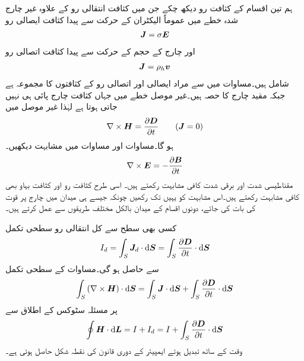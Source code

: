 ہم تین اقسام کے کثافت رو دیکھ چکے جن میں کثافت انتقالی رو کے علاوہ  غیر چارج شدہ خطے میں عموماً الیکٹران کے حرکت سے پیدا  کثافت ایصالی رو
\begin{align}
{\ensuremath{{\boldsymbol{J}}}}=\sigma {\ensuremath{{\boldsymbol{E}}}}
\end{align}
اور چارج کے حجم کے حرکت سے پیدا کثافت اتصالی رو
\begin{align}
{\ensuremath{{\boldsymbol{J}}}}=\rho_h {{\boldsymbol{v}}}
\end{align}
شامل ہیں۔مساوات  میں  سے مراد ایصالی اور اتصالی رو کے کثافتوں کا مجموعہ ہے جبکہ مقید چارج  کا حصہ ہیں۔غیر موصل خطے میں جہاں کثافت چارج پائی ہی نہیں جاتی  ہوتا ہے لہٰذا غیر موصل میں
\begin{align}\label{مساوات_میکس_ویل_مقناطیسی_شدت_گردش}
\nabla \times {\ensuremath{{\boldsymbol{H}}}}=\frac{\partial {\ensuremath{{\boldsymbol{D}}}}}{\partial t}  \quad \quad ({{\boldsymbol{J}}}=0)
\end{align}
ہو گا۔مساوات  اور مساوات  میں مشابہت دیکھیں۔
\begin{align*}
\nabla \times {\ensuremath{{\boldsymbol{E}}}}=-\frac{\partial {\ensuremath{{\boldsymbol{B}}}}}{\partial t}
\end{align*} 
مقناطیسی شدت  اور برقی شدت  کافی مشابہت رکھتے ہیں۔ اسی طرح کثافت رو  اور کثافت بہاو  بھی کافی مشابہت رکھتے ہیں۔اس مشابہت کو یہیں تک رکھیں چونکہ جیسے ہی میدان میں چارج پر قوت کی بات کی جائے، دونوں اقسام کے میدان بالکل مختلف طریقوں سے  عمل کرتے ہیں۔

کسی بھی سطح سے کل انتقالی رو سطحی تکمل
\begin{align}
I_d=\int_S \kvec{J}_d \cdot \dif \kvec{S}=\int_S \frac{\partial \kvec{D}}{\partial t} \cdot \dif \kvec{S}
\end{align}
سے حاصل ہو گی۔مساوات  کے سطحی تکمل
\begin{align*}
\int_S \left(\nabla \times \kvec{H} \right) \cdot \dif \kvec{S}=\int_S \kvec{J} \cdot \dif \kvec{S}+\int_S \frac{\partial \kvec{D}}{\partial t} \cdot \dif \kvec{S}
\end{align*}
پر مسئلہ سٹوکس کے اطلاق سے
\begin{align}
\oint \kvec{H} \cdot \dif \kvec{L}=I+I_d=I+\int_S \frac{\partial \kvec{D}}{\partial t} \cdot \dif \kvec{S}
\end{align}
 وقت کے ساتھ تبدیل ہوتے ایمپیئر کے دوری قانون کی نقطہ شکل حاصل ہوتی ہے۔

